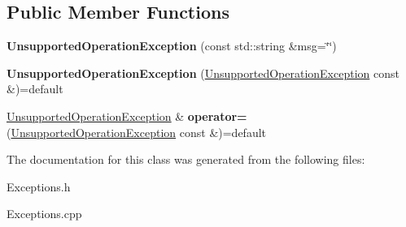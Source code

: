 \subsection*{Public Member Functions}
\begin{DoxyCompactItemize}
\item 
\mbox{\label{classantlr4_1_1UnsupportedOperationException_a2086bad7c1a51f28c5d52407f1714f6c}} 
{\bfseries Unsupported\+Operation\+Exception} (const std\+::string \&msg=\char`\"{}\char`\"{})
\item 
\mbox{\label{classantlr4_1_1UnsupportedOperationException_ae2d81ea411ac18d0835626c5580672c2}} 
{\bfseries Unsupported\+Operation\+Exception} (\hyperlink{classantlr4_1_1UnsupportedOperationException}{Unsupported\+Operation\+Exception} const \&)=default
\item 
\mbox{\label{classantlr4_1_1UnsupportedOperationException_af3d1df4784c973103c56508005c1e112}} 
\hyperlink{classantlr4_1_1UnsupportedOperationException}{Unsupported\+Operation\+Exception} \& {\bfseries operator=} (\hyperlink{classantlr4_1_1UnsupportedOperationException}{Unsupported\+Operation\+Exception} const \&)=default
\end{DoxyCompactItemize}


The documentation for this class was generated from the following files\+:\begin{DoxyCompactItemize}
\item 
Exceptions.\+h\item 
Exceptions.\+cpp\end{DoxyCompactItemize}
